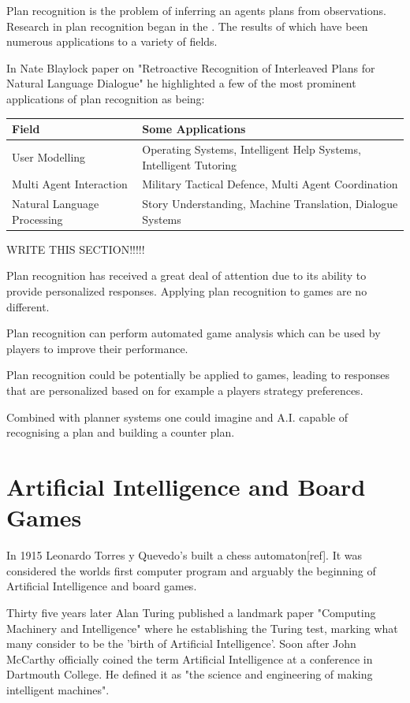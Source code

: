 \documentclass[parskip]{cs4rep}
\begin{document}
Plan recognition is the problem of inferring an agents plans from observations. Research in plan recognition began in the . The results of which have been numerous applications to a variety of fields.

In Nate Blaylock paper on "Retroactive Recognition of Interleaved Plans for Natural Language Dialogue" \cite{oai:CiteSeerPSU:538953} he highlighted a few of the most prominent applications of plan recognition as being:

\begin{tabular}{|l|p{8cm}|}
\hline 
\textbf{Field} & \textbf{Some Applications} \\ 
\hline 
User Modelling & Operating Systems, Intelligent Help Systems, Intelligent Tutoring \\ 
\hline 
Multi Agent Interaction & Military Tactical Defence, Multi Agent Coordination \\ 
\hline 
Natural Language Processing & Story Understanding, Machine Translation, Dialogue Systems \\ 
\hline
\end{tabular} 
\newline

WRITE THIS SECTION!!!!!

Plan recognition has received a great deal of attention due to its ability to provide personalized responses. Applying plan recognition to games are no different.

Plan recognition can perform automated game analysis which can be used by players to improve their performance. 

Plan recognition could be potentially be applied to games, leading to responses that are personalized based on for example a players strategy preferences.

Combined with planner systems one could imagine and A.I. capable of recognising a plan and building a counter plan.

\section{Artificial Intelligence and Board Games}

In 1915 Leonardo Torres y Quevedo's built a chess automaton[ref]. It was considered the worlds first computer program and arguably the beginning of Artificial Intelligence and board games.

Thirty five years later Alan Turing published a landmark paper "Computing Machinery and Intelligence" where he establishing the Turing test, marking what many consider to be the 'birth of Artificial Intelligence'. Soon after John McCarthy officially coined the term Artificial Intelligence at a conference in Dartmouth College. He defined it as "the science and engineering of making intelligent machines".
\end{document}
